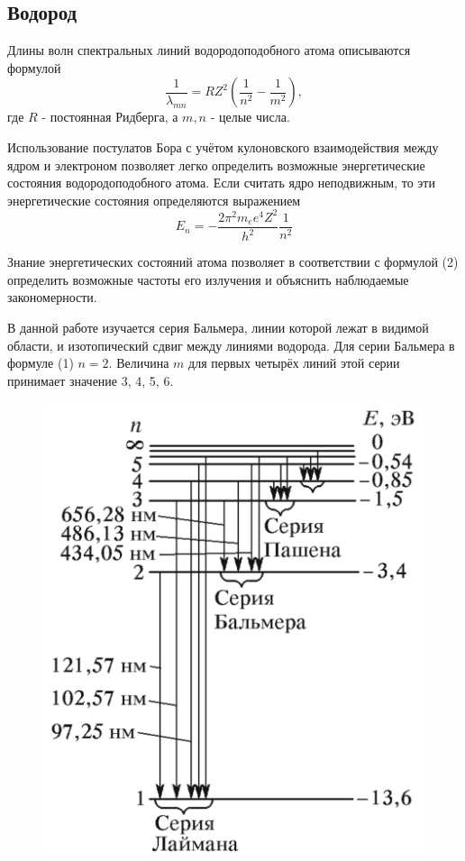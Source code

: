 \documentclass[a4paper]{article}
\begin{document}
\subsection{Водород}
Длины волн спектральных линий водородоподобного атома описываются формулой
\begin{equation}
    \frac{1}{\lambda_{mn}} = RZ^2(\frac{1}{n^2} - \frac{1}{m^2}),
\end{equation}
где $R$ - постоянная Ридберга, а $m, n$ -  целые числа. \par
Использование постулатов Бора с учётом кулоновского взаимодействия между ядром и электроном 
позволяет легко определить возможные энергетические состояния водородоподобного атома. Если 
считать ядро неподвижным, то эти энергетические состояния определяются выражением
\begin{equation}
    E_n = -\frac{2 \pi^2 m_e e^4 Z^2}{h^2} \frac{1}{n^2}
\end{equation}


Знание энергетических состояний атома позволяет в соответствии с формулой (2) определить 
возможные частоты его излучения и объяснить наблюдаемые закономерности. \par
В данной работе изучается серия Бальмера, линии которой лежат в видимой области, и изотопический 
сдвиг между линиями водорода. Для серии Бальмера в формуле (1) $n = 2$. Величина $m$ для первых 
четырёх линий этой серии принимает значение 3, 4, 5, 6. \par

\begin{figure}[H]
    \begin{center}
    \includegraphics[scale = 0.3]{p1.png}
    \caption{}
    \label{p1}
    \end{center}
\end{figure}
\end{document}
